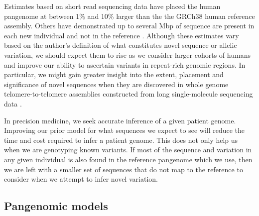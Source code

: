 Estimates based on short read sequencing data have placed the human pangenome at between 1\% \cite{li2010building} and 10\% \cite{sherman2019assembly} larger than the the GRCh38 human reference assembly.
Others have demonstrated up to several Mbp of sequence are present in each new individual and not in the reference \cite{li2010building,Hehir-Kwa2016-hb,Steinberg_2016,Audano_2019}.
Although these estimates vary based on the author's definition of what constitutes novel sequence or allelic variation, we should expect them to rise as we consider larger cohorts of humans and improve our ability to ascertain variants in repeat-rich genomic regions.
In particular, we might gain greater insight into the extent, placement and significance of novel sequences when they are discovered in whole genome telomere-to-telomere assemblies constructed from long single-molecule sequencing data \cite{miga2019telomere,Langley_2019}.



In precision medicine, we seek accurate inference of a given patient genome.
Improving our prior model for what sequences we expect to see will reduce the time and cost required to infer a patient genome.
This does not only help us when we are genotyping known variants.
If most of the sequence and variation in any given individual is also found in the reference pangenome which we use, then we are left with a smaller set of sequences that do not map to the reference to consider when we attempt to infer novel variation.

\subsection{Pangenomic models}

